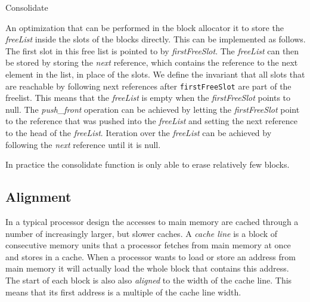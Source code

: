 \documentclass[10pt,a4paper]{article}
\begin{document}
\begin{algorithm}[H]
  \caption{Consolidate}\label{alg:consolidate}
  \begin{algorithmic}[1]
    \EndFor
    
      \label{alg:consolidate:erase}
      \Else
          \EndIf
       \EndFor
      \EndIf
    \EndFor
    \EndProcedure
  \end{algorithmic}
\end{algorithm}

\noindent An optimization that can be performed in the block allocator it to store the \emph{freeList} inside the slots of the blocks directly.
This can be implemented as follows.
The first slot in this free list is pointed to by \emph{firstFreeSlot}.
The \emph{freeList} can then be stored by storing the \emph{next} reference, which contains the reference to the next element in the list, in place of the slots.
We define the invariant that all slots that are reachable by following next references after \texttt{firstFreeSlot} are part of the freelist.
This means that the \emph{freeList} is empty when the \emph{firstFreeSlot} points to null.
The \emph{push\_front} operation can be achieved by letting the \emph{firstFreeSlot} point to the reference that was pushed into the \emph{freeList} and setting the next reference to the head of the \emph{freeList}.
Iteration over the \emph{freeList} can be achieved by following the \emph{next} reference until it is null.

In practice the consolidate function is only able to erase relatively few blocks.

\subsection{Alignment}

In a typical processor design the accesses to main memory are cached through a number of increasingly larger, but slower caches. 
A \emph{cache line} is a block of consecutive memory units that a processor fetches from main memory at once and stores in a cache. 
When a processor wants to load or store an address from main memory it will actually load the whole block that contains this address. 
The start of each block is also also \emph{aligned} to the width of the cache line. 
This means that its first address is a multiple of the cache line width.
\end{document}
